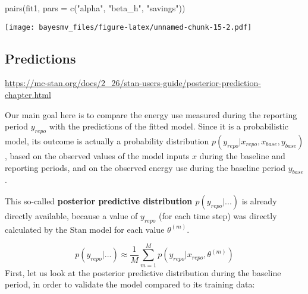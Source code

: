 \documentclass[
]{article}
\newenvironment{Shaded}{\begin{snugshade}}{\end{snugshade}}
\newcommand{\AttributeTok}[1]{\textcolor[rgb]{0.77,0.63,0.00}{#1}}
\newcommand{\FunctionTok}[1]{\textcolor[rgb]{0.00,0.00,0.00}{#1}}
\newcommand{\NormalTok}[1]{#1}
\newcommand{\StringTok}[1]{\textcolor[rgb]{0.31,0.60,0.02}{#1}}
\begin{document}
\begin{Shaded}
\begin{Highlighting}[]
\FunctionTok{pairs}\NormalTok{(fit1, }\AttributeTok{pars =} \FunctionTok{c}\NormalTok{(}\StringTok{"alpha"}\NormalTok{, }\StringTok{"beta\_h"}\NormalTok{, }\StringTok{"savings"}\NormalTok{))}
\end{Highlighting}
\end{Shaded}

\texttt{[image: bayesmv\_files/figure-latex/unnamed-chunk-15-2.pdf]}

\hypertarget{predictions}{%
\subsection{Predictions}\label{predictions}}

\url{https://mc-stan.org/docs/2_26/stan-users-guide/posterior-prediction-chapter.html}

Our main goal here is to compare the energy use measured during the reporting period \(y_\mathit{repo}\) with the predictions of the fitted model. Since it is a probabilistic model, its outcome is actually a probability distribution \(p\left(y_\mathit{repo}|x_\mathit{repo}, x_\mathit{base}, y_\mathit{base}\right)\), based on the observed values of the model inputs \(x\) during the baseline and reporting periods, and on the observed energy use during the baseline period \(y_\mathit{base}\).

This so-called \textbf{posterior predictive distribution \(p\left(y_\mathit{repo}|...\right)\)} is already directly available, because a value of \(y_\mathit{repo}\) (for each time step) was directly calculated by the Stan model for each value \(\theta^{(m)}\).

\[ p\left(y_\mathit{repo}|...\right) \approx \frac{1}{M} \sum_{m=1}^M p\left(y_\mathit{repo}|x_\mathit{repo},\theta^{(m)}\right) \]
First, let us look at the posterior predictive distribution during the baseline period, in order to validate the model compared to its training data:
\end{document}
